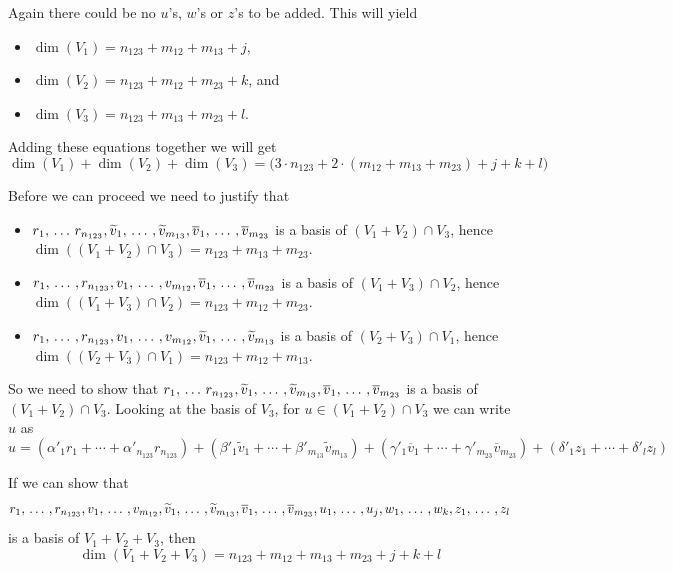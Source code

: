 \begin{failedattempt}
  Again there could be no $u$'s, $w$'s or $z$'s to be added. This will yield
  \begin{itemize}
    \item $\dim (V_1) = n_{123} + m_{12} + m_{13} + j$,
    \item $\dim (V_2) = n_{123} + m_{12} + m_{23} + k$, and
    \item $\dim (V_3) = n_{123} + m_{13} + m_{23} + l$.
  \end{itemize}

  Adding these equations together we will get
  \begin{equation}
    \label{eq: dim V_1 + dim V_2 + dim V_3}
      \dim (V_1)+ \dim (V_2) + \dim (V_3) = \Big(3 \cdot n_{123} + 2 \cdot (m_{12}+m_{13}+m_{23})+j+k+l \Big)
  \end{equation}

  Before we can proceed we need to justify that
  \begin{itemize}
    \item $r_1,  {\, \ldots \,\,} r_{n_{123}} ,  \widetilde{v}_1, {\, \ldots \,\,}, \widetilde{v}_{m_{13}}, \overline{v}_1, {\, \ldots \,\,}, \overline{v}_{m_{23}}$ is a basis of $(V_1+V_2) \cap V_3$, hence $\dim ((V_1+V_2) \cap V_3) = n_{123} + m_{13}+m_{23}$.
    \item $r_1, {\, \ldots \,\,}, r_{n_{123}}, v_1, {\, \ldots \,\,}, v_{m_{12}}, \overline{v}_1, {\, \ldots \,\,}, \overline{v}_{m_{23}}$ is a basis of $(V_1+V_3) \cap V_2$, hence $\dim ((V_1+V_3) \cap V_2) = n_{123} + m_{12}+m_{23}$.
    \item $r_1, {\, \ldots \,\,}, r_{n_{123}}, v_1, {\, \ldots \,\,}, v_{m_{12}}, \widetilde{v}_1, {\, \ldots \,\,}, \widetilde{v}_{m_{13}}$ is a basis of $(V_2+V_3) \cap V_1$, hence $\dim ((V_2+V_3) \cap V_1) = n_{123} + m_{12}+m_{13}$.
  \end{itemize}

  So we need to show that $r_1,  {\, \ldots \,\,} r_{n_{123}} ,  \widetilde{v}_1, {\, \ldots \,\,}, \widetilde{v}_{m_{13}}, \overline{v}_1, {\, \ldots \,\,}, \overline{v}_{m_{23}}$ is a basis of $(V_1+V_2) \cap V_3$.
  Looking at the basis of $V_3$, for $u \in (V_1 + V_2) \cap V_3$ we can write $u$ as
  \begin{equation}
    u = (\alpha'_1 r_1+ \cdots+ \alpha'_{n_{123}} r_{n_{123}})
    + (\beta'_1 \widetilde{v}_1+ \cdots+ \beta'_{m_{13}} \widetilde{v}_{m_{13}})
    + (\gamma'_1 \overline{v}_1+ \cdots+ \gamma'_{m_{23}} \overline{v}_{m_{23}})
    + (\delta'_1 z_1+\cdots+ \delta'_l z_l)
  \end{equation}

  If we can show that
  \begin{equation}
    \label{eq: basis of V_1 + V_2 + V_3}
    r_1, {\, \ldots \,\,}, r_{n_{123}}, v_1, {\, \ldots \,\,}, v_{m_{12}}, \widetilde{v}_1, {\, \ldots \,\,}, \widetilde{v}_{m_{13}}, \overline{v}_1, {\, \ldots \,\,}, \overline{v}_{m_{23}}, u_1, {\, \ldots \,\,}, u_j, w_1, {\, \ldots \,\,}, w_k, z_1, {\, \ldots \,\,}, z_l
  \end{equation}
  is a basis of $V_1 + V_2 + V_3$, then
  \begin{equation}
    \dim (V_1 + V_2 + V_3) = n_{123} + m_{12} + m_{13} + m_{23} + j + k + l
  \end{equation}


\end{failedattempt}
